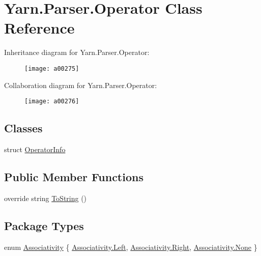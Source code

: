 \hypertarget{a00058}{\section{Yarn.\-Parser.\-Operator Class Reference}
\label{a00058}
}


Inheritance diagram for Yarn.\-Parser.\-Operator\-:
\nopagebreak
\begin{figure}[H]
\begin{center}
\leavevmode
\texttt{[image: a00275]}
\end{center}
\end{figure}


Collaboration diagram for Yarn.\-Parser.\-Operator\-:
\nopagebreak
\begin{figure}[H]
\begin{center}
\leavevmode
\texttt{[image: a00276]}
\end{center}
\end{figure}
\subsection*{Classes}
\begin{DoxyCompactItemize}
\item 
struct \hyperlink{a00059}{Operator\-Info}
\end{DoxyCompactItemize}
\subsection*{Public Member Functions}
\begin{DoxyCompactItemize}
\item 
override string \hyperlink{a00063_a18c67cb16090d0889bb9d6c8c6c565f8}{To\-String} ()
\end{DoxyCompactItemize}
\subsection*{Package Types}
\begin{DoxyCompactItemize}
\item 
enum \hyperlink{a00058_a83fa1b8db0e6678006920812b6f33f62}{Associativity} \{ \hyperlink{a00058_a83fa1b8db0e6678006920812b6f33f62a945d5e233cf7d6240f6b783b36a374ff}{Associativity.\-Left}, 
\hyperlink{a00058_a83fa1b8db0e6678006920812b6f33f62a92b09c7c48c520c3c55e497875da437c}{Associativity.\-Right}, 
\hyperlink{a00058_a83fa1b8db0e6678006920812b6f33f62a6adf97f83acf6453d4a6a4b1070f3754}{Associativity.\-None}
 \}
\end{DoxyCompactItemize}

